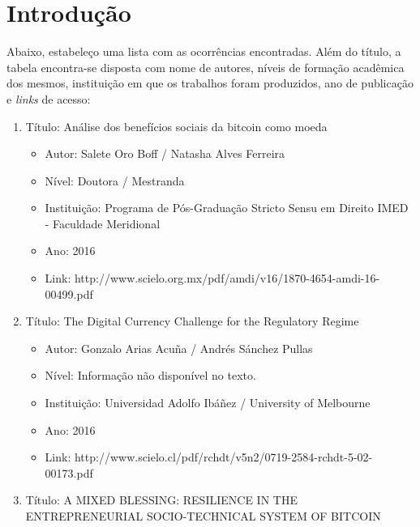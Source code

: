 \documentclass[12pt]{article}
\begin{document}
\section{Introdução}

Abaixo, estabeleço uma lista com as ocorrências encontradas. Além do título, a tabela encontra-se disposta com nome de autores, níveis de formação acadêmica dos mesmos, instituição em que os trabalhos foram produzidos, ano de publicação e \textit{links} de acesso:

\begin{enumerate}[I]

\item Título: Análise dos benefícios sociais da bitcoin como moeda

\begin{itemize}

\item Autor: Salete Oro Boff / Natasha Alves Ferreira

\item Nível: Doutora / Mestranda

\item Instituição: Programa de Pós-Graduação Stricto Sensu em Direito IMED - Faculdade Meridional

\item Ano: 2016

\item Link: http://www.scielo.org.mx/pdf/amdi/v16/1870-4654-amdi-16-00499.pdf

\end{itemize}


\item Título: The Digital Currency Challenge for the Regulatory Regime
\begin{itemize}

\item Autor: 
Gonzalo Arias Acuña / Andrés Sánchez Pullas
\item Nível: Informação não disponível no texto.
\item Instituição: Universidad Adolfo Ibáñez / University of Melbourne
\item Ano: 
2016
\item Link: 
http://www.scielo.cl/pdf/rchdt/v5n2/0719-2584-rchdt-5-02-00173.pdf
\end{itemize}


\item Título: A MIXED BLESSING: RESILIENCE IN THE ENTREPRENEURIAL SOCIO-TECHNICAL SYSTEM OF BITCOIN
\begin{itemize}


\end{itemize}
\end{enumerate}
\end{document}
